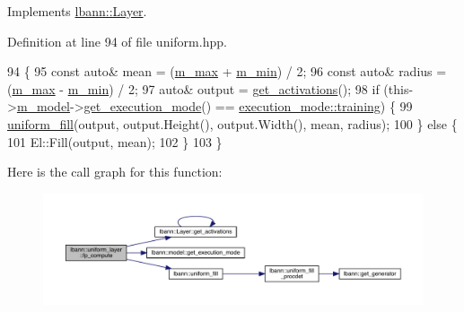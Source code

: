Implements \hyperlink{classlbann_1_1Layer_a523319dd1bd87a0612afa1912bb5aad7}{lbann\+::\+Layer}.



Definition at line 94 of file uniform.\+hpp.


\begin{DoxyCode}
94                              \{
95     \textcolor{keyword}{const} \textcolor{keyword}{auto}& mean = (\hyperlink{classlbann_1_1uniform__layer_a45004689408c17baf76399f64489c8d4}{m\_max} + \hyperlink{classlbann_1_1uniform__layer_ad2da58c380cf2803da709dd936c19aa1}{m\_min}) / 2;
96     \textcolor{keyword}{const} \textcolor{keyword}{auto}& radius = (\hyperlink{classlbann_1_1uniform__layer_a45004689408c17baf76399f64489c8d4}{m\_max} - \hyperlink{classlbann_1_1uniform__layer_ad2da58c380cf2803da709dd936c19aa1}{m\_min}) / 2;
97     \textcolor{keyword}{auto}& output = \hyperlink{classlbann_1_1Layer_a1134b1a4385af199d7272c5aa827fa99}{get\_activations}();
98     \textcolor{keywordflow}{if} (this->\hyperlink{classlbann_1_1Layer_a3d9315e99574166f2f33e37b572021d2}{m\_model}->\hyperlink{classlbann_1_1model_addb40597cf29aa6d31b6a7d09ef48608}{get\_execution\_mode}() == 
      \hyperlink{base_8hpp_a2781a159088df64ed7d47cc91c4dc0a8ac185ddac8b5a8f5aa23c5b80bc12d214}{execution\_mode::training}) \{
99       \hyperlink{namespacelbann_a7336c565aa23c1dab784530c581db3d1}{uniform\_fill}(output, output.Height(), output.Width(), mean, radius);
100     \} \textcolor{keywordflow}{else} \{
101       El::Fill(output, mean);
102     \}
103   \}
\end{DoxyCode}
Here is the call graph for this function\+:\nopagebreak
\begin{figure}[H]
\begin{center}
\leavevmode
\includegraphics[width=350pt]{classlbann_1_1uniform__layer_a975ba9cfcd974fe348ee9681d1feb879_cgraph}
\end{center}
\end{figure}
\mbox{\label{classlbann_1_1uniform__layer_adacae6beb724aa10b7f625b1418e9015}} 
